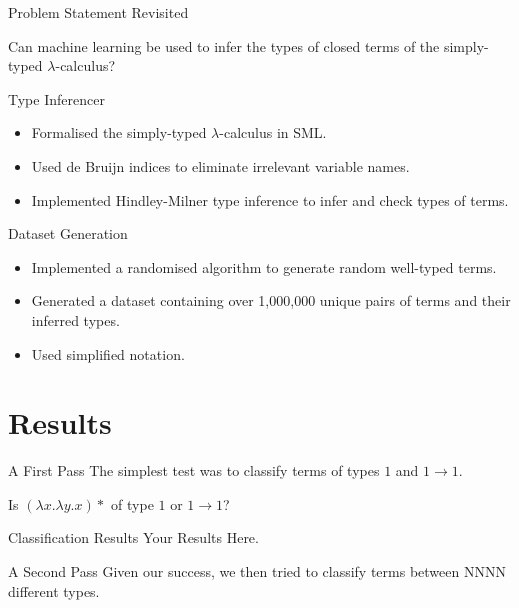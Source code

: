 \documentclass[17pt]{beamer}
\begin{document}
\begin{frame}{Problem Statement Revisited}
  \begin{center}
    Can machine learning be used to infer the types of closed terms of
    the simply-typed $\lambda$-calculus?
  \end{center}
\end{frame}

\begin{frame}{Type Inferencer}
  \begin{itemize}
  \item Formalised the simply-typed $\lambda$-calculus in SML.
  \item Used de Bruijn indices to eliminate irrelevant variable names.
  \item Implemented Hindley-Milner type inference to infer and check
    types of terms.
  \end{itemize}
\end{frame}

\begin{frame}{Dataset Generation}
  \begin{itemize}
  \item Implemented a randomised algorithm to generate random
    well-typed terms.
  \item Generated a dataset containing over 1,000,000 unique pairs of
    terms and their inferred types.
  \item Used simplified notation.
  \end{itemize}
\end{frame}

\section{Results}

\begin{frame}{A First Pass}
  The simplest test was to classify terms of types $1$ and $1 \to 1$.

  \begin{example}
    Is $(\lambda x.\lambda y. x)*$ of type $1$ or $1 \to 1$?
  \end{example}
\end{frame}

\begin{frame}{Classification Results}
  Your Results Here.
\end{frame}

\begin{frame}{A Second Pass}
  Given our success, we then tried to classify terms between NNNN
  different types.
\end{frame}
\end{document}

